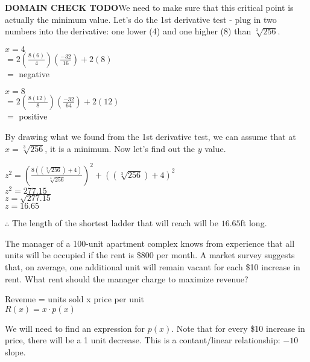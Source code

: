 \documentclass[12pt,fleqn]{book} %
\begin{document}
\noindent \textbf{DOMAIN CHECK TODO}We need to make sure that this critical point is actually the minimum value. Let's do the 1st derivative test - plug in two numbers
into the derivative: one lower (4) and one higher (8) than $\sqrt[3]{256}$.

\begin{multicols}{2}
    \begin{center}
        \underline{$x=4$} \\
        $=2(\frac{8(6)}{4})(\frac{-32}{16})+2(8)$ \\
        $=$ negative

        \columnbreak
        \underline{$x=8$}\\
        $=2(\frac{8(12)}{8})(\frac{-32}{64})+2(12)$ \\
        $=$ positive
    \end{center}
\end{multicols}

\noindent By drawing what we found from the 1st derivative test, we can assume that at $x=\sqrt[3]{256}$, it is a minimum. Now let's find out the $y$ value.

\begin{center}
    $z^2=(\frac{8((\sqrt[3]{256})+4)}{\sqrt[3]{256}})^2+((\sqrt[3]{256})+4)^2$ \\
    $z^2=277.15$ \\
    $z=\sqrt{277.15}$ \\
    $z=16.65$
\end{center}

\noindent $\therefore$ The length of the shortest ladder that will reach will be $16.65$ft long.

\vspace*{5mm}


\noindent\small{The manager of a 100-unit apartment complex knows from experience that all units will be occupied if the rent is \$800 per month. A market survey suggests
    that, on average, one additional unit will remain vacant for each \$10 increase in rent. What rent should the manager charge to maximize revenue?}

\begin{center}
    Revenue = units sold x price per unit \\
    $R(x) = x \cdot p(x)$
\end{center}

\noindent We will need to find an expression for $p(x)$. Note that for every \$10 increase in price, there will be a 1 unit decrease. This is a contant/linear relationship: $-10$ slope.
\end{document}
